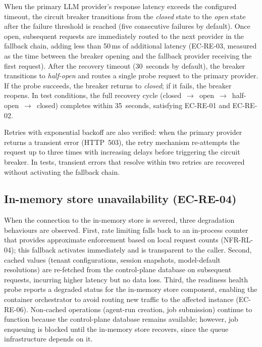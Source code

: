 \documentclass[a4paper]{sapthesis}
\begin{document}
When the primary LLM provider's response latency exceeds the configured
timeout, the circuit breaker transitions from the \emph{closed} state to
the \emph{open} state after the failure threshold is reached (five
consecutive failures by default).  Once open, subsequent requests are
immediately routed to the next provider in the fallback chain, adding
less than 50\,ms of additional latency (EC-RE-03, measured as the time
between the breaker opening and the fallback provider receiving the
first request).  After the recovery timeout (30~seconds by default), the
breaker transitions to \emph{half-open} and routes a single probe
request to the primary provider.  If the probe succeeds, the breaker
returns to \emph{closed}; if it fails, the breaker reopens.  In test
conditions, the full recovery cycle (closed~$\to$~open~$\to$~half-open~$\to$~closed)
completes within 35~seconds, satisfying EC-RE-01 and EC-RE-02.

Retries with exponential backoff are also verified: when the primary
provider returns a transient error (HTTP~503), the retry mechanism
re-attempts the request up to three times with increasing delays before
triggering the circuit breaker.  In tests, transient errors that resolve
within two retries are recovered without activating the fallback chain.

\subsection{In-memory store unavailability (EC-RE-04)}

When the connection to the in-memory store is severed, three degradation
behaviours are observed.  First, rate limiting falls back to an
in-process counter that provides approximate enforcement based on local
request counts (NFR-RL-04); this fallback activates immediately and is
transparent to the caller.  Second, cached values (tenant configurations,
session snapshots, model-default resolutions) are re-fetched from the
control-plane database on subsequent requests, incurring higher latency
but no data loss.  Third, the readiness health probe reports a degraded
status for the in-memory store component, enabling the container
orchestrator to avoid routing new traffic to the affected instance
(EC-RE-06).  Non-cached operations (agent-run creation, job submission)
continue to function because the control-plane database remains
available; however, job enqueuing is blocked until the in-memory store
recovers, since the queue infrastructure depends on it.
\end{document}
